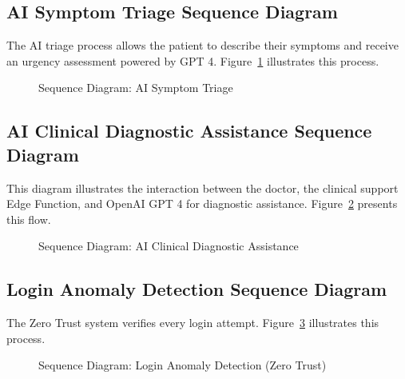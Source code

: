 \documentclass[12pt,a4paper,oneside]{report}
\begin{document}

\subsection{AI Symptom Triage Sequence Diagram}

The AI triage process allows the patient to describe their symptoms and receive an urgency assessment powered by GPT 4. Figure~\ref{fig:seq triage} illustrates this process.

\begin{figure}[H]
    \centering
    \resizebox{0.92\textwidth}{!}{}
    \caption{Sequence Diagram: AI Symptom Triage}
    \label{fig:seq triage}
\end{figure}


\subsection{AI Clinical Diagnostic Assistance Sequence Diagram}

This diagram illustrates the interaction between the doctor, the clinical support Edge Function, and OpenAI GPT 4 for diagnostic assistance. Figure~\ref{fig:seq clinical ai} presents this flow.

\begin{figure}[H]
    \centering
    \resizebox{0.92\textwidth}{!}{}
    \caption{Sequence Diagram: AI Clinical Diagnostic Assistance}
    \label{fig:seq clinical ai}
\end{figure}


\subsection{Login Anomaly Detection Sequence Diagram}

The Zero Trust system verifies every login attempt. Figure~\ref{fig:seq anomaly} illustrates this process.

\begin{figure}[H]
    \centering
    \resizebox{\textwidth}{!}{}
    \caption{Sequence Diagram: Login Anomaly Detection (Zero Trust)}
    \label{fig:seq anomaly}
\end{figure}
\end{document}
